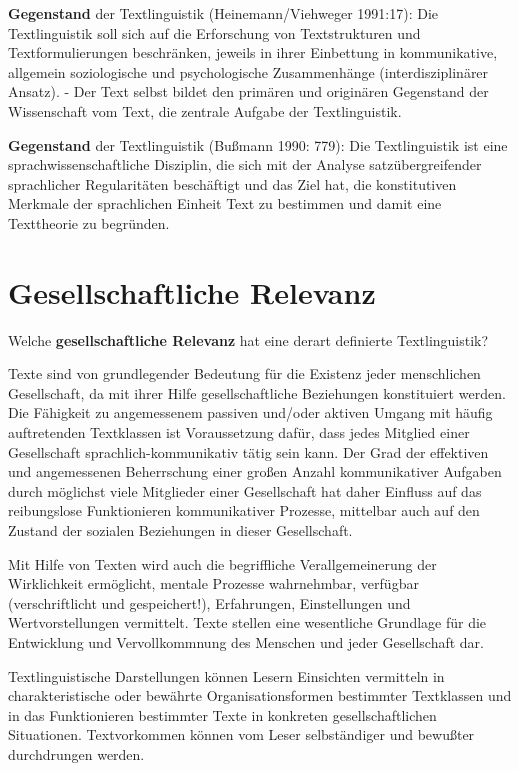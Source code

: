 \documentclass[
  letterpaper,
  DIV=11,
  numbers=noendperiod]{scrreprt}
\begin{document}
\textbf{Gegenstand} der Textlinguistik (Heinemann/Viehweger 1991:17):
Die Textlinguistik soll sich auf die Erforschung von Textstrukturen und
Textformulierungen beschränken, jeweils in ihrer Einbettung in
kommunikative, allgemein soziologische und psychologische Zusammenhänge
(interdisziplinärer Ansatz). - Der Text selbst bildet den primären und
originären Gegenstand der Wissenschaft vom Text, die zentrale Aufgabe
der Textlinguistik.

\textbf{Gegenstand} der Textlinguistik (Bußmann 1990: 779): Die
Textlinguistik ist eine sprachwissenschaftliche Disziplin, die sich mit
der Analyse satzübergreifender sprachlicher Regularitäten beschäftigt
und das Ziel hat, die konstitutiven Merkmale der sprachlichen Einheit
Text zu bestimmen und damit eine Texttheorie zu begründen.

\hypertarget{gesellschaftliche-relevanz}{%
\section{Gesellschaftliche Relevanz}\label{gesellschaftliche-relevanz}}

Welche \textbf{gesellschaftliche Relevanz} hat eine derart definierte
Textlinguistik?

Texte sind von grundlegender Bedeutung für die Existenz jeder
menschlichen Gesellschaft, da mit ihrer Hilfe gesellschaftliche
Beziehungen konstituiert werden. Die Fähigkeit zu angemessenem passiven
und/oder aktiven Umgang mit häufig auftretenden Textklassen ist
Voraussetzung dafür, dass jedes Mitglied einer Gesellschaft
sprachlich-kommunikativ tätig sein kann. Der Grad der effektiven und
angemessenen Beherrschung einer großen Anzahl kommunikativer Aufgaben
durch möglichst viele Mitglieder einer Gesellschaft hat daher Einfluss
auf das reibungslose Funktionieren kommunikativer Prozesse, mittelbar
auch auf den Zustand der sozialen Beziehungen in dieser Gesellschaft.

Mit Hilfe von Texten wird auch die begriffliche Verallgemeinerung der
Wirklichkeit ermöglicht, mentale Prozesse wahrnehmbar, verfügbar
(verschriftlicht und gespeichert!), Erfahrungen, Einstellungen und
Wertvorstellungen vermittelt. Texte stellen eine wesentliche Grundlage
für die Entwicklung und Vervollkommnung des Menschen und jeder
Gesellschaft dar.

Textlinguistische Darstellungen können Lesern Einsichten vermitteln in
charakteristische oder bewährte Organisationsformen bestimmter
Textklassen und in das Funktionieren bestimmter Texte in konkreten
gesellschaftlichen Situationen. Textvorkommen können vom Leser
selbständiger und bewußter durchdrungen werden.
\end{document}
